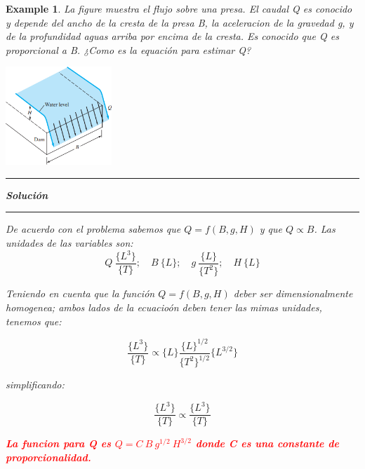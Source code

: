 \documentclass[10pt, oneside]{article}
\newtheorem{exa}{Example}
\begin{document}
\begin{shaded}
\begin{exa}
La figure muestra el flujo sobre una presa. El caudal Q es conocido y depende del ancho de la cresta de la presa B, la aceleracion de la gravedad g, y de la profundidad aguas arriba por encima de la cresta. Es conocido que Q es proporcional a B. ¿Como es la equaci\'on para estimar Q?       
\begin{center}
\includegraphics[width=4cm]{pdam}
\end{center}
\vspace{0.2cm}
\hrule
\vspace{0.2cm}
\noindent \textbf{Soluci\'on}
\vspace{0.2cm}
\hrule
\vspace{0.2cm}
De acuerdo con el problema sabemos que $Q=f(B,g,H)$ y que $Q\propto B$. Las unidades de las variables son:
$$
Q\ \frac{\{L^3\}}{\{T\}}; \quad B \ \{L\}; \quad g \ \frac{\{L\}}{\{T^2\}}; \quad H \ \{L\}
$$

Teniendo en cuenta que la funci\'on $Q=f(B,g,H)$ deber ser dimensionalmente homogenea; ambos lados de la ecuacio\'on deben tener las mimas unidades, tenemos que: 

$$
\frac{\{L^3\}}{\{T\}} \propto \{L\}  \frac{\{L\}^{1/2}}{\{T^2\}^{1/2}} \{L^{3/2}\}
$$

simplificando:

$$
\frac{\{L^3\}}{\{T\}} \propto \frac{\{L^3\}}{\{T\}}
$$


\begin{center}
\textcolor{red}{\textbf{La funcion para Q es $Q = C \ B \ g^{1/2} \ H^{3/2}$ donde C es una constante de proporcionalidad.}}
\end{center}





\end{exa}
\end{shaded}
\end{document}
